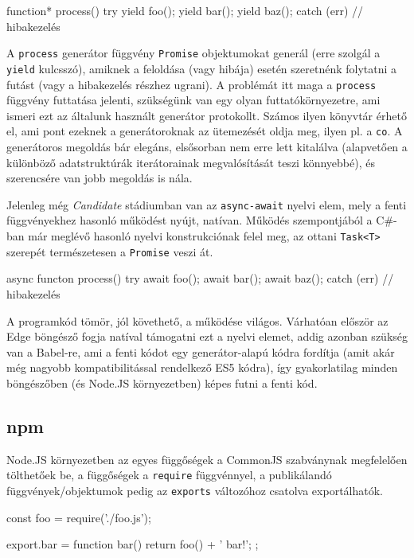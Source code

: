 \begin{js}
function* process() {
  try {
    yield foo();
    yield bar();
    yield baz();
  } catch (err) {
    // hibakezelés
  }
}
\end{js}

A \texttt{process} generátor függvény \texttt{Promise} objektumokat generál
(erre szolgál a \texttt{yield} kulcsszó), amiknek a feloldása (vagy hibája)
esetén szeretnénk folytatni a futást (vagy a hibakezelés részhez ugrani).  A
problémát itt maga a \texttt{process} függvény futtatása jelenti, szükségünk van
egy olyan futtatókörnyezetre, ami ismeri ezt az általunk használt generátor
protokollt.  Számos ilyen könyvtár érhető el, ami pont ezeknek a generátoroknak az
ütemezését oldja meg, ilyen pl.  a \texttt{co}\cite{co}. A generátoros megoldás
bár elegáns, elsősorban nem erre lett kitalálva (alapvetően a különböző
adatstruktúrák iterátorainak megvalósítását teszi könnyebbé), és szerencsére van
jobb megoldás is nála.

Jelenleg még \emph{Candidate} stádiumban van az \texttt{async-await} nyelvi
elem, mely a fenti függvényekhez hasonló működést nyújt, natívan.  Működés
szempontjából a C\#-ban már meglévő hasonló nyelvi konstrukciónak felel meg, az
ottani \texttt{Task<T>} szerepét természetesen a \texttt{Promise} veszi át.

\begin{js}
async functon process() {
  try {
    await foo();
    await bar();
    await baz();
  } catch (err) {
    // hibakezelés
  }
}
\end{js}

A programkód tömör, jól követhető, a működése világos.  Várhatóan először az
Edge böngésző fogja natíval támogatni ezt a nyelvi elemet, addig azonban szükség
van a Babel-re, ami a fenti kódot egy generátor-alapú kódra fordítja (amit akár
még nagyobb kompatibilitással rendelkező ES5 kódra), így gyakorlatilag minden
böngészőben (és Node.JS környezetben) képes futni a fenti kód.

\subsection{npm}

Node.JS környezetben az egyes függőségek a CommonJS\cite{commonjs} szabványnak
megfelelően tölthetőek be, a függőségek a \texttt{require} függvénnyel, a
publikálandó függvények/objektumok pedig az \texttt{exports} változóhoz csatolva
exportálhatók.

\begin{js}
const foo = require('./foo.js');

export.bar = function bar() {
  return foo() + ' bar!';
};
\end{js}

